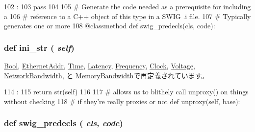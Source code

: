 \begin{DoxyCode}
102                                :
103         pass
104 
105     # Generate the code needed as a prerequisite for including a
106     # reference to a C++ object of this type in a SWIG .i file.
107     # Typically generates one or more %
108     @classmethod
    def swig_predecls(cls, code):
\end{DoxyCode}
\hypertarget{classm5_1_1params_1_1ParamValue_a33ebe6cd32bcbd15465fc28b9d94bf82}{
\subsubsection[{ini\_\-str}]{\setlength{\rightskip}{0pt plus 5cm}def ini\_\-str ( {\em self})}}
\label{classm5_1_1params_1_1ParamValue_a33ebe6cd32bcbd15465fc28b9d94bf82}


\hyperlink{classm5_1_1params_1_1Bool_a33ebe6cd32bcbd15465fc28b9d94bf82}{Bool}, \hyperlink{classm5_1_1params_1_1EthernetAddr_a33ebe6cd32bcbd15465fc28b9d94bf82}{EthernetAddr}, \hyperlink{classm5_1_1params_1_1Time_a33ebe6cd32bcbd15465fc28b9d94bf82}{Time}, \hyperlink{classm5_1_1params_1_1Latency_a33ebe6cd32bcbd15465fc28b9d94bf82}{Latency}, \hyperlink{classm5_1_1params_1_1Frequency_a33ebe6cd32bcbd15465fc28b9d94bf82}{Frequency}, \hyperlink{classm5_1_1params_1_1Clock_a33ebe6cd32bcbd15465fc28b9d94bf82}{Clock}, \hyperlink{classm5_1_1params_1_1Voltage_a33ebe6cd32bcbd15465fc28b9d94bf82}{Voltage}, \hyperlink{classm5_1_1params_1_1NetworkBandwidth_a33ebe6cd32bcbd15465fc28b9d94bf82}{NetworkBandwidth}, と \hyperlink{classm5_1_1params_1_1MemoryBandwidth_a33ebe6cd32bcbd15465fc28b9d94bf82}{MemoryBandwidth}で再定義されています。


\begin{DoxyCode}
114                      :
115         return str(self)
116 
117     # allows us to blithely call unproxy() on things without checking
118     # if they're really proxies or not
    def unproxy(self, base):
\end{DoxyCode}
\hypertarget{classm5_1_1params_1_1ParamValue_ab3dbcf5716623eac67a8ccc074fa7e13}{
\subsubsection[{swig\_\-predecls}]{\setlength{\rightskip}{0pt plus 5cm}def swig\_\-predecls ( {\em cls}, \/   {\em code})}}
\label{classm5_1_1params_1_1ParamValue_ab3dbcf5716623eac67a8ccc074fa7e13}


